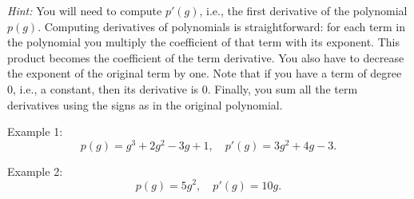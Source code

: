 \documentclass[a4paper,10pt]{article}
\begin{document}
\begin{enumerate}
  \textit{Hint:} You will need to compute $p'(g)$, i.e., the first derivative of the polynomial $p(g)$. Computing derivatives of polynomials is straightforward: for each term in the polynomial you multiply the coefficient of that term with its exponent. This product becomes the coefficient of the term derivative. You also have to decrease the exponent of the original term by one. Note that if you have a term of degree $0$, i.e., a constant, then its derivative is $0$. Finally, you sum all the term derivatives using the signs as in the original polynomial.

  Example 1:
  \[
    p(g) = g^3 + 2g^2 - 3g + 1, \quad p'(g) = 3g^2 + 4g - 3.
  \]

  Example 2:
  \[
    p(g) = 5g^2, \quad p'(g) = 10g.
  \]

\end{enumerate}

\newpage
\mbox{} 

\newpage
\mbox{} 
\end{document}
